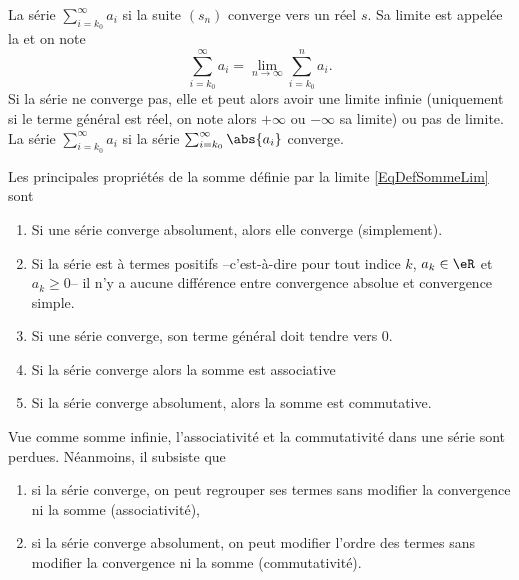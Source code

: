 La série $\sum_{i=k_0}^\infty a_i$  si la suite $(s_n)$
converge vers un réel $s$. Sa limite est appelée la  et on note
\begin{equation}		\label{EqDefSommeLim}
  \sum_{i=k_0}^\infty a_i = \lim_{n\to\infty}\sum_{i=k_0}^na_i.
\end{equation}
Si la série ne converge pas, elle  et peut alors avoir
une limite infinie (uniquement si le terme général est réel, on note
alors $+\infty$ ou $-\infty$ sa limite) ou pas de limite.  La série
$\sum_{i=k_0}^\infty a_i$  si la série
$\sum_{i=k_0}^\infty \abs{a_i}$ converge.

\begin{proposition}\label{propnseries_propdebase}
Les principales propriétés de la somme définie par la limite \eqref{EqDefSommeLim} sont
  \begin{enumerate}
  \item Si une série converge absolument, alors elle converge
    (simplement).
  \item Si la série est à termes positifs --c'est-à-dire pour tout
    indice $k$, $a_k \in \eR$ et $a_k \geq 0$-- il n'y a aucune
    différence entre convergence absolue et convergence simple.
  \item\label{point3-seriepropdebase} Si une série converge, son terme général doit tendre vers $0$.
\item 
Si la série converge alors la somme est associative
\item
Si la série converge absolument, alors la somme est commutative.
  \end{enumerate}
\end{proposition}

\begin{remark}Vue comme somme infinie, l'associativité et la
  commutativité dans une série sont perdues. Néanmoins, il subsiste
  que
  \begin{enumerate}
  \item si la série converge, on peut regrouper ses termes sans
    modifier la convergence ni la somme (associativité),
  \item si la série converge absolument, on peut modifier l'ordre des
    termes sans modifier la convergence ni la somme (commutativité).
  \end{enumerate}
\end{remark}


